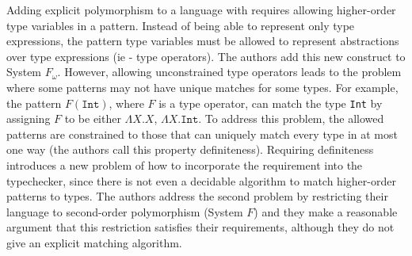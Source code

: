\documentclass[12pt]{article}	%
\begin{document}
Adding explicit polymorphism to a language with \Dynamic requires allowing higher-order type variables in a \typecase pattern. Instead of being able to represent only type expressions, the pattern type variables must be allowed to represent abstractions over type expressions (ie - type operators). The authors add this new \typecase construct to System $F_\omega$. However, allowing unconstrained type operators leads to the problem where some \typecase patterns may not have unique matches for some types. For example, the pattern $F(\mathtt{Int})$, where $F$ is a type operator, can match the type \texttt{Int} by assigning $F$ to be either $\Lambda X.X$, $\Lambda X.\mathtt{Int}$. To address this problem, the allowed patterns are constrained to those that can uniquely match every type in at most one way (the authors call this property definiteness). Requiring definiteness introduces a new problem of how to incorporate the requirement into the typechecker, since there is not even a decidable algorithm to match higher-order patterns to types. The authors address the second problem by restricting their language to second-order polymorphism (System $F$) and they make a reasonable argument that this restriction satisfies their requirements, although they do not give an explicit matching algorithm.
\end{document}
